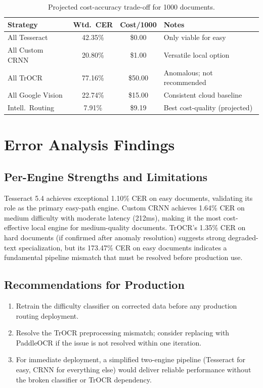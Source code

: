 \documentclass[12pt,a4paper]{article}
\begin{document}
\begin{table}[H]
  \centering
  \small
  \begin{tabular}{lccl}
    \toprule
    \textbf{Strategy} & \textbf{Wtd.\ CER}
    & \textbf{Cost/1000} & \textbf{Notes} \\
    \midrule
    All Tesseract       & 42.35\% & \$0.00
    & Only viable for easy \\
    All Custom CRNN     & 20.80\% & \$1.00
    & Versatile local option \\
    All TrOCR           & 77.16\% & \$50.00
    & Anomalous; not recommended \\
    All Google Vision   & 22.74\% & \$15.00
    & Consistent cloud baseline \\
    Intell.\ Routing    & 7.91\%  & \$9.19
    & Best cost-quality (projected) \\
    \bottomrule
  \end{tabular}
  \caption{Projected cost-accuracy trade-off for 1000 documents.}
\end{table}

\section{Error Analysis Findings}

\subsection{Per-Engine Strengths and Limitations}

Tesseract 5.4 achieves exceptional 1.10\% CER on easy documents,
validating its role as the primary easy-path engine. Custom CRNN
achieves 1.64\% CER on medium difficulty with moderate latency
(212ms), making it the most cost-effective local engine for
medium-quality documents. TrOCR's 1.35\% CER on hard documents
(if confirmed after anomaly resolution) suggests strong degraded-text
specialization, but its 173.47\% CER on easy documents indicates a
fundamental pipeline mismatch that must be resolved before production
use.

\subsection{Recommendations for Production}

\begin{enumerate}
  \item Retrain the difficulty classifier on corrected data before
    any production routing deployment.
  \item Resolve the TrOCR preprocessing mismatch; consider replacing
    with PaddleOCR if the issue is not resolved within one
    iteration.
  \item For immediate deployment, a simplified two-engine pipeline
    (Tesseract for easy, CRNN for everything else) would deliver
    reliable performance without the broken classifier or TrOCR
    dependency.
\end{enumerate}
\end{document}
